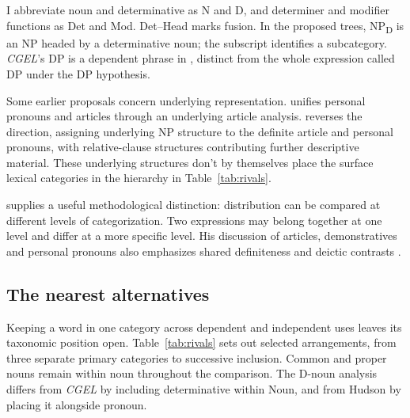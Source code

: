 \documentclass[12pt]{article}
\begin{document}
I abbreviate noun and determinative as N and D, and determiner and modifier functions as Det and Mod. Det--Head marks fusion. In the proposed trees, NP\textsubscript{D} is an NP headed by a determinative noun; the subscript identifies a subcategory. \textit{CGEL}'s DP is a dependent phrase in , distinct from the whole expression called DP under the DP hypothesis.

Some earlier proposals concern underlying representation. \textcite{postal1966} unifies personal pronouns and articles through an underlying article analysis. \textcite[197--203]{sommerstein1972} reverses the direction, assigning underlying NP structure to the definite article and personal pronouns, with relative-clause structures contributing further descriptive material. These underlying structures don't by themselves place the surface lexical categories in the hierarchy in Table~\ref{tab:rivals}.

\textcite[232--235]{lyons1968} supplies a useful methodological distinction: distribution can be compared at different levels of categorization. Two expressions may belong together at one level and differ at a more specific level. His discussion of articles, demonstratives and personal pronouns also emphasizes shared definiteness and deictic contrasts \citep[279]{lyons1968}.

\subsection{The nearest alternatives}

Keeping a word in one category across dependent and independent uses leaves its taxonomic position open. Table~\ref{tab:rivals} sets out selected arrangements, from three separate primary categories to successive inclusion. Common and proper nouns remain within noun throughout the comparison. The D-noun analysis differs from \textit{CGEL} by including determinative within Noun, and from Hudson by placing it alongside pronoun.
\end{document}
